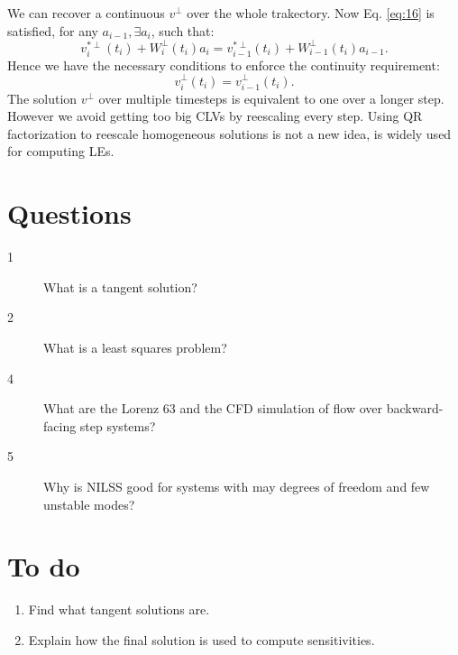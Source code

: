 \documentclass[10pt,twoside,a4paper]{article} %
\begin{document}
We can recover a continuous $v^\perp$ over the whole trakectory. Now Eq. \ref{eq:16} is satisfied, for any $a_{i-1}, \exists a_i$, such that:
\begin{equation}
  v_i^{*\perp}(t_i) + W_i^\perp (t_i)a_i = v_{i-1}^{*\perp}(t_i) + W_{i-1}^\perp(t_i)a_{i-1}.
  \label{eq:20}
\end{equation}
Hence we have the necessary conditions to enforce the continuity requirement:
\begin{equation}
  v_i^\perp(t_i) = v_{i-1}^\perp(t_i).
  \label{eq:21}
\end{equation}
The solution $v^\perp$ over multiple timesteps is equivalent to one over a longer step. However we avoid getting too big CLVs by reescaling every step. Using QR factorization to reescale homogeneous solutions is not a new idea, is widely used for computing LEs\cite{chater}.
\section{Questions}
\begin{description}
  \item [1] What is a tangent solution?
  \item [2] What is a least squares problem?
  \item [4] What are the Lorenz 63 and the CFD simulation of flow over backward-facing step systems?
  \item [5] Why is NILSS good for systems with may degrees of freedom and few unstable modes?
\end{description}
\newpage
\section{To do}

\begin{enumerate}
  \item Find what tangent solutions are.
  \item Explain how the final solution is used to compute sensitivities.
\end{enumerate}
\end{document}
